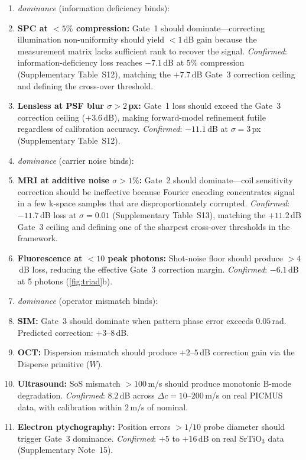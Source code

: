 \begin{enumerate}
\item[\textit{Gate~1}] \textit{dominance} (information deficiency binds):
\item \textbf{SPC at $<5\%$ compression:} Gate~1 should dominate---correcting illumination non-uniformity should yield $<1$\,dB gain because the measurement matrix lacks sufficient rank to recover the signal. \emph{Confirmed}: information-deficiency loss reaches $-7.1$\,dB at $5\%$ compression (Supplementary Table~S12), matching the $+7.7$\,dB Gate~3 correction ceiling and defining the cross-over threshold.
\item \textbf{Lensless at PSF blur $\sigma > 2$\,px:} Gate~1 loss should exceed the Gate~3 correction ceiling ($+3.6$\,dB), making forward-model refinement futile regardless of calibration accuracy. \emph{Confirmed}: $-11.1$\,dB at $\sigma{=}3$\,px (Supplementary Table~S12).
\item[\textit{Gate~2}] \textit{dominance} (carrier noise binds):
\item \textbf{MRI at additive noise $\sigma > 1\%$:} Gate~2 should dominate---coil sensitivity correction should be ineffective because Fourier encoding concentrates signal in a few k-space samples that are disproportionately corrupted. \emph{Confirmed}: $-11.7$\,dB loss at $\sigma{=}0.01$ (Supplementary Table~S13), matching the $+11.2$\,dB Gate~3 ceiling and defining one of the sharpest cross-over thresholds in the framework.
\item \textbf{Fluorescence at $<10$ peak photons:} Shot-noise floor should produce $>4$\,dB loss, reducing the effective Gate~3 correction margin. \emph{Confirmed}: $-6.1$\,dB at 5 photons (\cref{fig:triad}b).
\item[\textit{Gate~3}] \textit{dominance} (operator mismatch binds):
\item \textbf{SIM:} Gate~3 should dominate when pattern phase error exceeds $0.05$\,rad. Predicted correction: $+3$--$8$\,dB.
\item \textbf{OCT:} Dispersion mismatch should produce $+2$--$5$\,dB correction gain via the Disperse primitive ($W$).
\item \textbf{Ultrasound:} SoS mismatch $>100$\,m/s should produce monotonic B-mode degradation. \emph{Confirmed}: $8.2$\,dB across $\Delta c = 10$--$200$\,m/s on real PICMUS data, with calibration within $2$\,m/s of nominal.
\item \textbf{Electron ptychography:} Position errors $>1/10$ probe diameter should trigger Gate~3 dominance. \emph{Confirmed}: $+5$ to $+16$\,dB on real SrTiO$_3$ data (Supplementary Note~15).

\end{enumerate}
